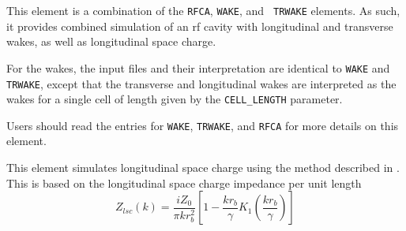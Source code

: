 This element is a combination of the {\tt RFCA}, {\tt WAKE}, and {\tt
TRWAKE} elements.  As such, it provides combined simulation of an rf
cavity with longitudinal and transverse wakes, as well as longitudinal
space charge.

For the wakes, the input files and their interpretation are identical
to {\tt WAKE} and {\tt TRWAKE}, except that the transverse and
longitudinal wakes are interpreted as the wakes for a single cell of
length given by the {\tt CELL\_LENGTH} parameter.

Users should read the entries for {\tt WAKE}, {\tt TRWAKE}, and {\tt RFCA}
for more details on this element.

This element simulates longitudinal space charge using the
method described in \cite{Huang2004}.  This is based on the 
longitudinal space charge impedance per unit length
\begin{equation}
  Z_{lsc}(k) = \frac{i Z_0}{\pi k r_b^2} \left[ 1 - \frac{kr_b}{\gamma}K_1 \left(\frac{kr_b}{\gamma}\right)\right]
\end{equation}
